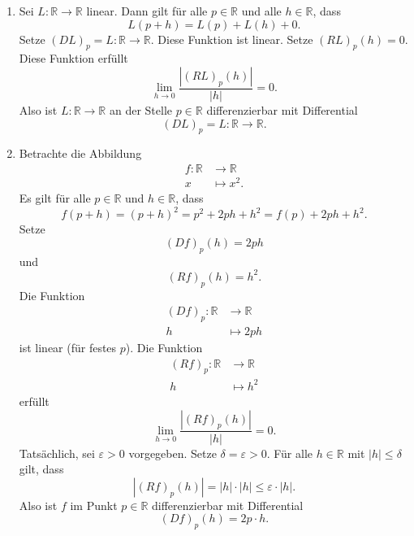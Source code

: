 \documentclass[../main.tex]{subfiles}
\begin{document}
\begin{examples}
  \leavevmode
  \begin{enumerate}[(1)]
    \item Sei $L \colon \mathbb{R} \to \mathbb{R}$ 
      linear.
      Dann gilt für alle $p \in \mathbb{R}$ und alle
      $h \in \mathbb{R}$, dass
      \[
        L(p + h) = L(p) + L(h) + 0.
      \]
      Setze ${(DL)}_p = L \colon \mathbb{R} \to \mathbb{R}$.
      Diese Funktion ist linear. Setze
      ${(RL)}_p(h) = 0$. Diese Funktion erfüllt
      \[
        \lim_{h \to 0} \frac{|{(RL)}_p(h)|}{|h|} = 0.
      \]
      Also ist $L \colon \mathbb{R} \to \mathbb{R}$
      an der Stelle $p \in \mathbb{R}$ 
      differenzierbar mit Differential
      \[
      {(DL)}_p = L \colon \mathbb{R} \to \mathbb{R}.
      \]
    \item Betrachte die Abbildung
      \begin{align*}
        f \colon \mathbb{R} & \to \mathbb{R} \\
        x & \mapsto x^2.
      \end{align*}
      Es gilt für alle $p \in \mathbb{R}$ und
      $h \in \mathbb{R}$, dass
      \[
        f( p + h ) = {(p + h)}^2
        = p^2 + 2ph + h^2
        = f(p) + 2ph + h^2.
      \]
      Setze
      \[
        {(Df)}_p(h) = 2ph
      \]
      und
      \[
        {(Rf)}_p(h) = h^2.
      \]
      Die Funktion
      \begin{align*}
        {(Df)}_p \colon \mathbb{R} & \to \mathbb{R} \\
        h & \mapsto 2ph
      \end{align*}
      ist linear (für festes $p$).
      Die Funktion
      \begin{align*}
        {(Rf)}_p \colon \mathbb{R} & \to \mathbb{R} \\
        h & \mapsto h^2
      \end{align*}
      erfüllt
      \[
        \lim_{h \to 0} \frac{|{(Rf)}_p(h)|}{|h|} = 0.
      \]
      Tatsächlich, sei $\varepsilon > 0$ vorgegeben.
      Setze $\delta = \varepsilon > 0$.
      Für alle $h \in \mathbb{R}$ mit $|h| \leq \delta$ gilt,
      dass
      \[
        |{(Rf)}_p(h)| = |h| \cdot |h| \leq \varepsilon \cdot |h|.
      \]
      Also ist $f$ im Punkt $p \in \mathbb{R}$ differenzierbar
      mit Differential
      \[
        {(Df)}_p(h) = 2p \cdot h.
      \]
  \end{enumerate}
\end{examples}
\end{document}
